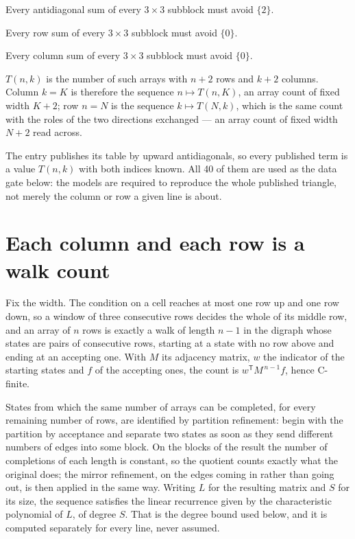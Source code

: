 \documentclass[11pt]{article}
\theoremstyle{definition}
\begin{document}
Every antidiagonal sum of every $3\times3$ subblock must avoid $\{2\}$.

Every row sum of every $3\times3$ subblock must avoid $\{0\}$.

Every column sum of every $3\times3$ subblock must avoid $\{0\}$.

$T(n,k)$ is the number of such arrays with $n + 2$ rows and $k + 2$ columns. Column $k = K$ is therefore the sequence $n \mapsto T(n,K)$, an array count of fixed width $K + 2$; row $n = N$ is the sequence $k \mapsto T(N,k)$, which is the same count with the roles of the two directions exchanged --- an array count of fixed width $N + 2$ read across.

The entry publishes its table by upward antidiagonals, so every published term is a value $T(n,k)$ with both indices known. All 40 of them are used as the data gate below: the models are required to reproduce the whole published triangle, not merely the column or row a given line is about.

\section{Each column and each row is a walk count}

Fix the width. The condition on a cell reaches at most one row up and one row down, so a window of three consecutive rows decides the whole of its middle row, and an array of $n$ rows is exactly a walk of length $n-1$ in the digraph whose states are pairs of consecutive rows, starting at a state with no row above and ending at an accepting one. With $M$ its adjacency matrix, $w$ the indicator of the starting states and $f$ of the accepting ones, the count is $w^{\mathsf T}M^{\,n-1}f$, hence C-finite.

States from which the same number of arrays can be completed, for every remaining number of rows, are identified by partition refinement: begin with the partition by acceptance and separate two states as soon as they send different numbers of edges into some block. On the blocks of the result the number of completions of each length is constant, so the quotient counts exactly what the original does; the mirror refinement, on the edges coming in rather than going out, is then applied in the same way. Writing $L$ for the resulting matrix and $S$ for its size, the sequence satisfies the linear recurrence given by the characteristic polynomial of $L$, of degree $S$. That is the degree bound used below, and it is computed separately for every line, never assumed.
\end{document}
